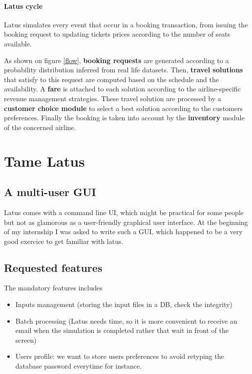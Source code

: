 \documentclass[11pt]{JHEP3}
\begin{document}

\paragraph{Latus cycle}

Latus simulates every event that occur in a booking transaction, from issuing the booking request to updating tickets prices according to the number of seats available.

As shown on figure \ref{flow}, \textbf{booking requests} are generated according to a probability distribution inferred from real life datasets. Then, \textbf{travel solutions} that satisfy to this request are computed based on the schedule and the availability. A \textbf{fare} is attached to each solution according to the airline-specific revenue management strategies. These travel solution are processed by a \textbf{customer choice module} to select a best solution according to the customers preferences. Finally the booking is taken into account by the \textbf{inventory} module of the concerned airline.


\newpage
\section{Tame Latus}

\subsection{A multi-user GUI}

Latus comes with a command line UI, which might be practical for some people but not as glamorous as a user-friendly graphical user interface. At the beginning of my internship I was asked to write such a GUI, which happened to be a very good exercice to get familiar with latus.


\subsection{Requested features}

The mandatory features includes 

\begin{itemize}
\item Inputs management (storing the input files in a DB, check the integrity)
\item Batch processing (Latus needs time, so it is more convenient to receive an email when the simulation is completed rather that wait in front of the screen)
\item Users profile: we want to store users preferences to avoid retyping the database password everytime for instance.
\end{itemize}
\end{document}

